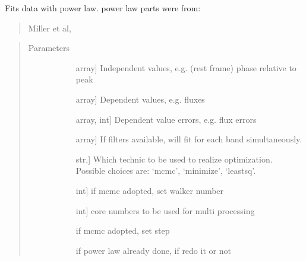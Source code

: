 \documentclass[letterpaper,10pt,english]{sphinxmanual}
\begin{document}
\begin{fulllineitems}
\label{\detokenize{generated/sdapy.model_fitters.fit_model:sdapy.model_fitters.fit_model}}
Fits data with power law.
power law parts were from:
\begin{quote}

Miller et al, 
\end{quote}
\begin{quote}\begin{description}
\item[{Parameters}] \leavevmode\begin{description}
\item[{}] \leavevmode{[}array{]}
Independent values, e.g. (rest frame) phase relative to peak

\item[{}] \leavevmode{[}array{]}
Dependent values, e.g. fluxes

\item[{}] \leavevmode{[}array, int{]}
Dependent value errors, e.g. flux errors

\item[{}] \leavevmode{[}array{]}
If filters available, will fit for each band simultaneously.

\item[{}] \leavevmode{[}str,{]}
Which technic to be used to realize optimization.
Possible choices are: ‘mcmc’, ‘minimize’, ‘leastsq’.

\item[{}] \leavevmode{[}int{]}
if mcmc adopted, set walker number

\item[{}] \leavevmode{[}int{]}
core numbers to be used for multi processing

\item[{}] \leavevmode
if mcmc adopted, set step

\item[{}] \leavevmode
if power law already done, if redo it or not


\end{description}
\end{description}
\end{quote}
\end{fulllineitems}
\end{document}
